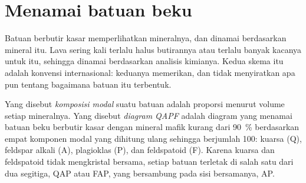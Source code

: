 \section{Menamai batuan beku}\label{sec:b2:magmatic-series:naming}

Batuan berbutir kasar memperlihatkan mineralnya, dan dinamai berdasarkan mineral itu. Lava sering kali terlalu
halus butirannya atau terlalu banyak kacanya untuk itu, sehingga dinamai berdasarkan analisis kimianya. Kedua
skema itu adalah konvensi internasional: keduanya memerikan, dan tidak menyiratkan apa pun tentang bagaimana
batuan itu terbentuk.

\begin{definition}\label{def:b2:magmatic-series:qapf}
Yang disebut \emph{komposisi modal} suatu batuan adalah proporsi menurut
volume setiap mineralnya. Yang disebut \emph{diagram QAPF} adalah diagram yang menamai
batuan beku berbutir kasar dengan mineral mafik kurang dari \qty{90}{\percent} berdasarkan
empat komponen modal yang dihitung ulang sehingga berjumlah 100: kuarsa (Q), feldspar alkali
(A), plagioklas (P), dan feldspatoid (F). Karena kuarsa dan feldspatoid tidak
mengkristal bersama, setiap batuan terletak di salah satu dari dua segitiga, QAP atau FAP, yang bersambung
pada sisi bersamanya, AP.
\end{definition}

